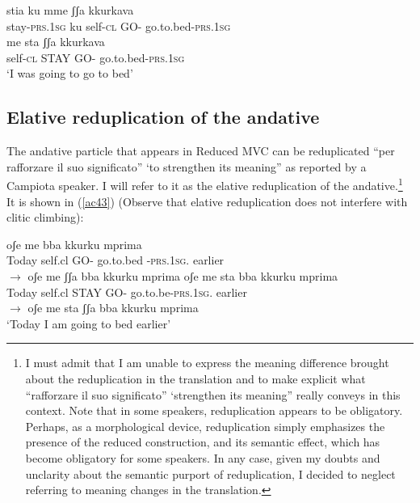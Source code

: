 \documentclass[output=paper]{langscibook}
\begin{document}
\ea \label{ac42}
    \ea \label{ac42a}\gll stia       ku mme   ʃʃa   kkurkava \\
    stay-\textsc{prs}.\textsc{1sg} ku self-\textsc{cl}  GO- go.to.bed-\textsc{prs}.\textsc{1sg}\\
    \ex \label{ac42b}\gll me    sta    ʃʃa   kkurkava\\
    self-\textsc{cl} STAY GO- go.to.bed-\textsc{prs}.\textsc{1sg}\\
    \glt ‘I was going to go to bed’
    \z
\z


\subsection{Elative reduplication of the andative}

The andative particle that appears in Reduced MVC can be reduplicated “per rafforzare il suo significato” ‘to strengthen its meaning” as reported by a Campiota speaker.  I will refer to it as the elative reduplication of the andative.\footnote{I must admit that I am unable to express the meaning difference brought about the reduplication in the translation and to make explicit what “rafforzare il suo significato” ‘strengthen its meaning” really conveys in this context.  Note that in some speakers, reduplication appears to be obligatory.  Perhaps, as a morphological device, reduplication simply emphasizes the presence of the reduced construction, and its semantic effect, which has become obligatory for some speakers. In any case, given my doubts and unclarity about the semantic purport of reduplication, I decided to neglect referring to meaning changes in the translation.}  It is shown in (\ref{ac43}) (Observe that elative reduplication does not interfere with clitic climbing):

\ea \label{ac43}
    \ea \label{ac43a}
        \ea \label{ac43ai}\gll oʃe    me      bba   kkurku         mprima\\
       Today self.cl    GO-   go.to.bed -\textsc{prs}.\textsc{1sg}.   earlier\\
        \ex \label{ac43aii}$\rightarrow$ oʃe    me    ʃʃa  bba   kkurku         mprima
        \z
    \ex \label{ac43b}
        \ea \label{ac43bi}\gll oʃe    me   sta     bba  kkurku      mprima\\
       Today self.cl  STAY  GO-  go.to.be-\textsc{prs}.\textsc{1sg}.   earlier\\
        \ex   \label{ac43bii}$\rightarrow$ oʃe    me   sta   ʃʃa bba  kkurku mprima\\
       ‘Today I am going to bed earlier’  
        \z
    \z
\z
 
\end{document}
